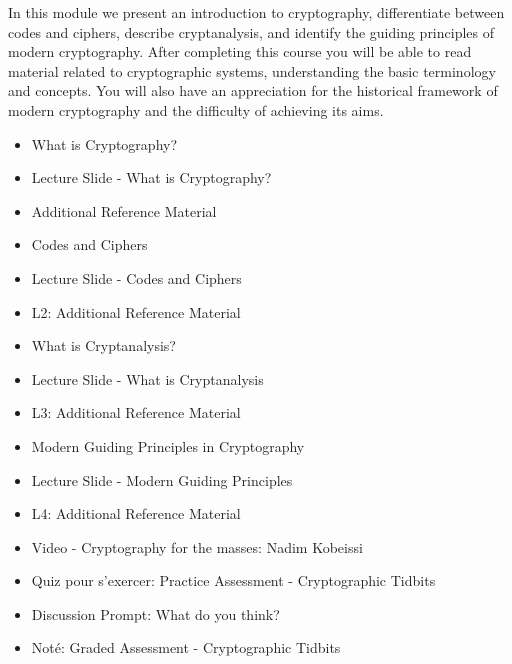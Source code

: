 In this module we present an introduction to cryptography, differentiate between codes and ciphers, describe cryptanalysis, and identify the guiding principles of modern cryptography. After completing this course you will be able to read material related to cryptographic systems, understanding the basic terminology and concepts. You will also have an appreciation for the historical framework of modern cryptography and the difficulty of achieving its aims.

\begin{itemize}[label={$\bullet$}]
    \item What is Cryptography?
    \item Lecture Slide - What is Cryptography?
    \item Additional Reference Material
    \item Codes and Ciphers
    \item Lecture Slide - Codes and Ciphers
    \item L2: Additional Reference Material
    \item What is Cryptanalysis?
    \item Lecture Slide - What is Cryptanalysis
    \item L3: Additional Reference Material
    \item Modern Guiding Principles in Cryptography
    \item Lecture Slide - Modern Guiding Principles
    \item L4: Additional Reference Material
    \item Video - Cryptography for the masses: Nadim Kobeissi
    \item Quiz pour s'exercer: Practice Assessment - Cryptographic Tidbits
    \item Discussion Prompt: What do you think?

    \item Noté: Graded Assessment - Cryptographic Tidbits
\end{itemize}


